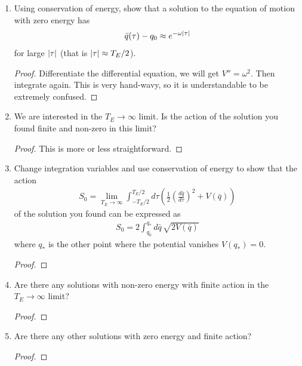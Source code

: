 \documentclass{book}
\theoremstyle{definition}
\newcommand{\f}[2]{\frac{#1}{#2}}
\newcommand{\lp}{\left(}
\newcommand{\rp}{\right)}
\begin{document}
\begin{enumerate}
\begin{proof}
	
	\end{proof}
	
	

	
	\item Using conservation of energy, show that a solution to the equation of motion with
	zero energy has
	\begin{align}
	\bar{q}(\tau) -q_0 \approx e^{-\omega \abs{\tau}}
	\end{align}
	for large $\abs{\tau}$ (that is $\abs{\tau} \approx T_E/2$). 
	
	\begin{proof}
		Differentiate the differential equation, we will get $V'' = \omega^2$. Then integrate again. This is very hand-wavy, so it is understandable to be extremely confused.  
	\end{proof}
	
	
	
	
	\item We are interested in the $T_E \to \infty$ limit. Is the action of the solution you found finite
	and non-zero in this limit?
	
	\begin{proof}
		This is more or less straightforward. 
	\end{proof}
	
	
	\item Change integration variables and use conservation of energy to show that the action
	\begin{align}
	S_0 = \lim_{T_E\to \infty} \int^{T_E/2}_{-T_E/2} d\tau \lp \f{1}{2}\lp \f{d\bar{q}}{d\tau} \rp^2 + V(\bar{q}) \rp
	\end{align}
	of the solution you found can be expressed as
	\begin{align}
	S_0 = 2\int^{q_*}_{q_0}d\bar{q}\, \sqrt{2V(\bar{q})}
	\end{align}
	where $q_*$ is the other point where the potential vanishes $V (q_*) = 0$. 
	
	\begin{proof}
		
	\end{proof}
	
	\item Are there any solutions with non-zero energy with finite action in the $T_E \to \infty$ limit? 
	
	\begin{proof}
		
	\end{proof}
	
	\item Are there any other solutions with zero energy and finite action?
	
	\begin{proof}
		
	\end{proof}
\end{enumerate}
\end{document}

